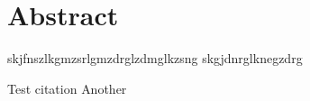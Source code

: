 \chapter{Abstract}

	skjfnszlkgmzsrlgmzdrglzdmglkzsng
	skgjdnrglknegzdrg
	
	Test citation \cite{Cooper2019}
	Another \cite{Jeong2020}
	
	
